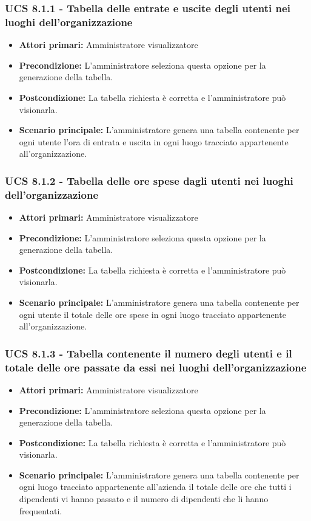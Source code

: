 \subsubsection{UCS 8.1.1 - Tabella delle entrate e uscite degli utenti nei luoghi dell'organizzazione}%
\begin{itemize}
\item \textbf{Attori primari:} Amministratore visualizzatore
\item \textbf{Precondizione:} L'amministratore seleziona questa opzione per la generazione della tabella.
\item \textbf{Postcondizione:} La tabella richiesta è corretta e l'amministratore può visionarla.
\item \textbf{Scenario principale:} L'amministratore genera una tabella contenente per ogni utente l'ora di entrata e uscita in ogni luogo tracciato appartenente all'organizzazione.
\end{itemize}

\subsubsection{UCS 8.1.2 - Tabella delle ore spese dagli utenti nei luoghi dell'organizzazione}%
\begin{itemize}
\item \textbf{Attori primari:} Amministratore visualizzatore
\item \textbf{Precondizione:} L'amministratore seleziona questa opzione per la generazione della tabella.
\item \textbf{Postcondizione:} La tabella richiesta è corretta e l'amministratore può visionarla.
\item \textbf{Scenario principale:} L'amministratore genera una tabella contenente per ogni utente il totale delle ore spese in ogni luogo tracciato appartenente all'organizzazione.
\end{itemize}

\subsubsection{UCS 8.1.3 - Tabella contenente il numero degli utenti e il totale delle ore passate da essi nei luoghi dell'organizzazione}%
\begin{itemize}
\item \textbf{Attori primari:} Amministratore visualizzatore
\item \textbf{Precondizione:} L'amministratore seleziona questa opzione per la generazione della tabella.
\item \textbf{Postcondizione:} La tabella richiesta è corretta e l'amministratore può visionarla.
\item \textbf{Scenario principale:} L'amministratore genera una tabella contenente per ogni luogo tracciato appartenente all'azienda il totale delle ore che tutti i dipendenti vi hanno passato e il numero di dipendenti che li hanno frequentati.
\end{itemize}

